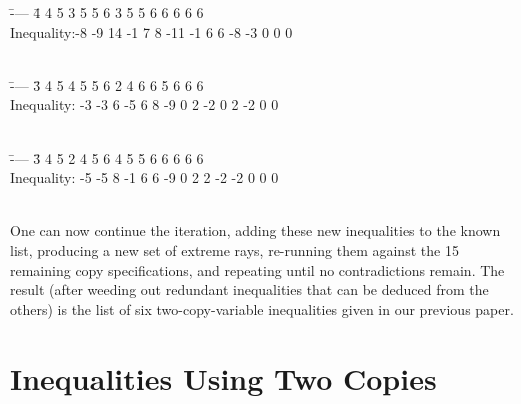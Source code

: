 \documentclass[10pt,journal]{IEEEtran}
\begin{document}
\begin{tabbing}
 \quad \=---- \= 4 4 5 3 5 5 6 3 5 5 6 6 6 6 6 \\
 \> \>Inequality:-8 -9 14 -1 7 8 -11 -1 6 6 -8 -3 0 0 0 \\
 \>      \\
\end{tabbing}
\begin{tabbing}
 \quad \=---- \= 3 4 5 4 5 5 6 2 4 6 6 5 6 6 6 \\
 \> \>Inequality: -3 -3 6 -5 6 8 -9 0 2 -2 0 2 -2 0 0 \\
 \>      \\
\end{tabbing}
\begin{tabbing}
 \quad \=---- \= 3 4 5 2 4 5 6 4 5 5 6 6 6 6 6  \\
 \> \>Inequality: -5 -5 8 -1 6 6 -9 0 2 2 -2 -2 0 0 0 \\
 \>      \\
\end{tabbing}

One can now continue the iteration, adding these new inequalities to the
known list, producing a new set of extreme rays, re-running them against
the 15 remaining copy specifications, and repeating until no contradictions
remain.  The result (after weeding out redundant inequalities that can be
deduced from the others) is the list of six two-copy-variable inequalities
given in our previous paper.



\section{Inequalities Using Two Copies}\label{TwoCopies}
\end{document}
